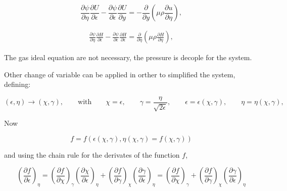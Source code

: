 \begin{equation} 
\frac{\partial \psi}{\partial \eta}
\frac{\partial U}{\partial \epsilon}
-
\frac{\partial \psi}{\partial \epsilon}
\frac{\partial U}{\partial y}
=-
\frac{\partial}{\partial y}
\left(\mu\rho\frac{\partial u}{\partial \eta}\right)
,
\end{equation} 


\begin{equation*} 
\begin{split} 
\frac{\partial \psi}{\partial \eta}
\frac{\partial H}{\partial \epsilon}
-
\frac{\partial \psi}{\partial \epsilon}
\frac{\partial H}{\partial \epsilon}
=
\frac{\partial}{\partial \eta}
    \left(
    \mu
    \rho
        \frac{\partial H}{\partial \eta}
    \right)
    ,
\end{split} 
\end{equation*} 

The gas ideal equation are not necessary,  
the pressure is decople for the system. 

Other change of variable  can be applied
in orther to simplified the system, 
defining: 

\begin{equation*} 
    (\epsilon,\eta)
    \rightarrow
    (\chi,\gamma)
    ,
    \qquad
    \text{with}
    \qquad
    \chi=\epsilon
    ,
    \qquad
    \gamma
    =
    \frac{\eta}{\sqrt{2\epsilon}}
    ,
    \qquad
    \epsilon=\epsilon(\chi,\gamma), 
    \qquad
    \eta=\eta(\chi,\gamma), 
\end{equation*} 

Now 

\begin{equation*}
    f=f(\epsilon(\chi,\gamma),\eta(\chi,\gamma)=f(\chi,\gamma))
\end{equation*} 

and using the chain rule for  the derivates of the function $f$, 

\begin{equation}
\left(
\frac{\partial f}{\partial \epsilon}
\right)_\eta
=
\left(
\frac{\partial f}{\partial \chi}
\right)_\gamma
\left(
\frac{\partial \chi}{\partial \epsilon}
\right)_\eta
+
\left(
\frac{\partial f}{\partial \gamma}
\right)_\chi
\left(
\frac{\partial \gamma}{\partial \epsilon}
\right)_\eta
=
\left(
\frac{\partial f}{\partial \chi}
\right)_\gamma
+
\left(
\frac{\partial f}{\partial \gamma}
\right)_\chi
\left(
\frac{\partial \gamma}{\partial \epsilon}
\right)_\eta
\end{equation} 


